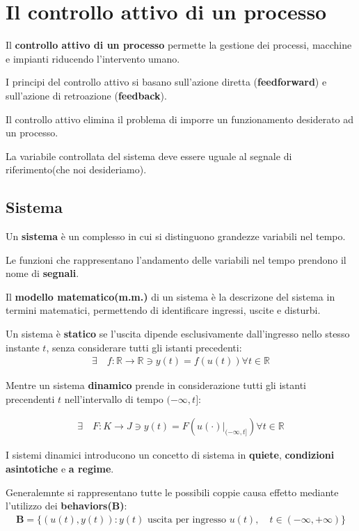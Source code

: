 \section{Il controllo attivo di un processo}

Il \textbf{controllo attivo di un processo} permette la gestione dei processi, macchine e impianti riducendo l'intervento umano.

I principi del controllo attivo si basano sull'azione diretta (\textbf{feedforward}) e sull'azione di retroazione (\textbf{feedback}).

Il controllo attivo elimina il problema di imporre un funzionamento desiderato ad un processo.

La variabile controllata del sistema deve essere uguale al segnale di riferimento(che noi desideriamo).

\subsection{Sistema}
Un \textbf{sistema} è un complesso in cui si distinguono grandezze variabili nel tempo.

Le funzioni che rappresentano l'andamento delle variabili nel tempo prendono il nome di \textbf{segnali}.


Il \textbf{modello matematico(m.m.)} di un sistema è la descrizone del sistema in termini matematici, permettendo di identificare ingressi, uscite e disturbi.


Un sistema è \textbf{statico} se l'uscita dipende esclusivamente dall'ingresso nello stesso instante $t$, senza considerare tutti gli istanti precedenti:
\begin{align}
	\exists \quad f: \mathbb{R} \rightarrow \mathbb{R} \ni y(t) = f(u(t)) \forall t \in \mathbb{R}
\end{align}


Mentre un sistema \textbf{dinamico} prende in considerazione tutti gli istanti precendenti $t$ nell'intervallo di tempo $(-\infty, t]$:

\begin{align}
	\exists \quad F: K \rightarrow J \ni y(t) = F(u(\cdot)|_{(-\infty, t]}) \forall t \in \mathbb{R}
\end{align}

I sistemi dinamici introducono un concetto di sistema in \textbf{quiete}, \textbf{condizioni asintotiche} e \textbf{a regime}.


Generalemnte si rappresentano tutte le possibili coppie causa effetto mediante l'utilizzo dei \textbf{behaviors($\mathbf{B}$)}:
\begin{align}
	\mathbf{B} = \{ (u(t), y(t)) : y(t) \text{ uscita per ingresso } u(t), \quad t \in (-\infty, +\infty)\}
\end{align}

